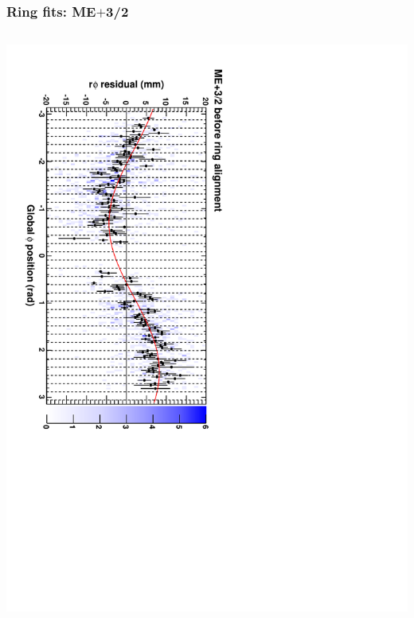 \documentclass[compress]{beamer}
\begin{document}
\begin{frame}
\frametitle{Ring fits: ME$+$3/2}
\vfill
\begin{columns}
\includegraphics[height=\linewidth, angle=90]{ringfits_before/mep32.pdf}


\end{columns}
\end{frame}
\end{document}
